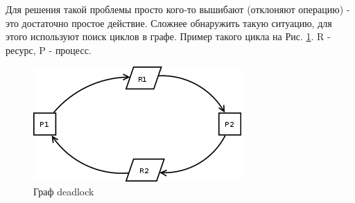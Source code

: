 Для решения такой проблемы просто кого-то вышибают (отклоняют операцию) - это достаточно простое действие. Сложнее обнаружить такую ситуацию, для этого используют поиск циклов в графе. Пример такого цикла на Рис. \ref{fig:dead}. R - ресурс, P - процесс. 

\begin{figure}[H]
	\centering
	\includegraphics[scale = 0.5]{6/deadlock.png}
	\caption{Граф deadlock}
	\label{fig:dead}
	
\end{figure}
